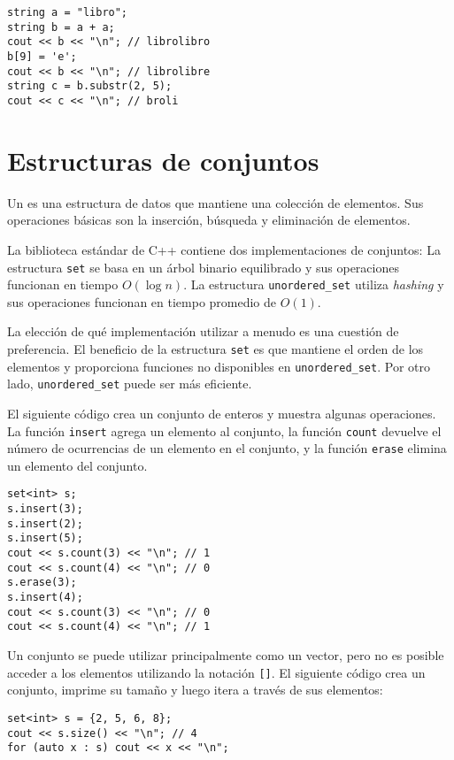 \begin{lstlisting}
string a = "libro";
string b = a + a;
cout << b << "\n"; // librolibro
b[9] = 'e';
cout << b << "\n"; // librolibre
string c = b.substr(2, 5);
cout << c << "\n"; // broli
\end{lstlisting}

\newpage
\section{Estructuras de conjuntos}


Un  es una estructura de datos que
mantiene una colección de elementos.
Sus operaciones básicas son la inserción,
búsqueda y eliminación de elementos.

La biblioteca estándar de C++ contiene dos implementaciones
de conjuntos:
La estructura \texttt{set} se basa en un árbol binario equilibrado
y sus operaciones funcionan en tiempo $O(\log n)$.
La estructura \texttt{unordered\_set} utiliza \textit{hashing}
y sus operaciones funcionan en tiempo promedio de $O(1)$.

La elección de qué implementación utilizar
a menudo es una cuestión de preferencia.
El beneficio de la estructura \texttt{set} es que mantiene
el orden de los elementos y proporciona funciones
no disponibles en \texttt{unordered\_set}.
Por otro lado, \texttt{unordered\_set}
puede ser más eficiente.

El siguiente código crea un conjunto de enteros
y muestra algunas operaciones.
La función \texttt{insert} agrega un elemento al conjunto,
la función \texttt{count} devuelve el número de ocurrencias
de un elemento en el conjunto,
y la función \texttt{erase} elimina un elemento del conjunto.

\begin{lstlisting}
set<int> s;
s.insert(3);
s.insert(2);
s.insert(5);
cout << s.count(3) << "\n"; // 1
cout << s.count(4) << "\n"; // 0
s.erase(3);
s.insert(4);
cout << s.count(3) << "\n"; // 0
cout << s.count(4) << "\n"; // 1
\end{lstlisting}

Un conjunto se puede utilizar principalmente como un vector,
pero no es posible acceder
a los elementos utilizando la notación \texttt{[]}.
El siguiente código crea un conjunto,
imprime su tamaño y luego
itera a través de sus elementos:
\begin{lstlisting}
set<int> s = {2, 5, 6, 8};
cout << s.size() << "\n"; // 4
for (auto x : s) cout << x << "\n";
\end{lstlisting}

